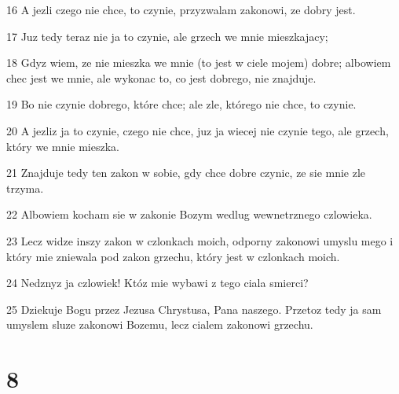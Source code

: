 \par 16 A jezli czego nie chce, to czynie, przyzwalam zakonowi, ze dobry jest.
\par 17 Juz tedy teraz nie ja to czynie, ale grzech we mnie mieszkajacy;
\par 18 Gdyz wiem, ze nie mieszka we mnie (to jest w ciele mojem) dobre; albowiem chec jest we mnie, ale wykonac to, co jest dobrego, nie znajduje.
\par 19 Bo nie czynie dobrego, które chce; ale zle, którego nie chce, to czynie.
\par 20 A jezliz ja to czynie, czego nie chce, juz ja wiecej nie czynie tego, ale grzech, który we mnie mieszka.
\par 21 Znajduje tedy ten zakon w sobie, gdy chce dobre czynic, ze sie mnie zle trzyma.
\par 22 Albowiem kocham sie w zakonie Bozym wedlug wewnetrznego czlowieka.
\par 23 Lecz widze inszy zakon w czlonkach moich, odporny zakonowi umyslu mego i który mie zniewala pod zakon grzechu, który jest w czlonkach moich.
\par 24 Nedznyz ja czlowiek! Któz mie wybawi z tego ciala smierci?
\par 25 Dziekuje Bogu przez Jezusa Chrystusa, Pana naszego. Przetoz tedy ja sam umyslem sluze zakonowi Bozemu, lecz cialem zakonowi grzechu.

\chapter{8}

